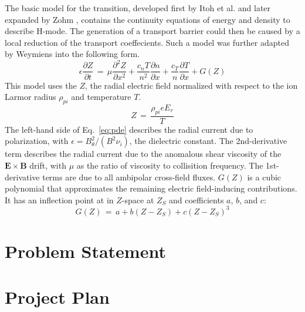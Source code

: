 \documentclass{article}
\begin{document}
The basic model for the transition, developed first by Itoh et al. \cite{itoh_edge_1991} and later expanded by Zohm \cite{zohm_dynamic_1994}, contains the continuity equations of energy and density to describe H-mode.
The generation of a transport barrier could then be caused by a local reduction of the transport coeffecients.
Such a model was further adapted by Weymiens \cite{weymiens_bifurcation_2014} into the following form.
\begin{equation}
	\epsilon \frac{\partial Z}{\partial t} \,=\, \mu \frac{\partial^2 Z}{\partial x^2} + \frac{c_n T}{n^2} \frac{\partial n}{\partial x} + \frac{c_T}{n} \frac{\partial T}{\partial x} + G(Z)
	\label{eq:pde}
\end{equation}
This model uses the $Z$, the radial electric field normalized with respect to the ion Larmor radius $\rho_{pi}$ and temperature $T$.
\begin{equation}
	Z \,=\, \frac{\rho_{pi} e E_r}{T}
	\label{eq:normalization}
\end{equation}
The left-hand side of Eq.~\ref{eq:pde} describes the radial current due to polarization, with $\epsilon = B_\theta^2 / (B^2 \nu_i)$, the dielectric constant.
The 2nd-derivative term describes the radial current due to the anomalous shear viscosity of the $\mathbf{E}\times\mathbf{B}$ drift, with $\mu$ as the ratio of viscosity to collisition frequency.
The 1st-derivative terms are due to all ambipolar cross-field fluxes.
$G(Z)$ is a cubic polynomial that approximates the remaining electric field-inducing contributions.
It has an inflection point at in $Z$-space at $Z_S$ and coefficients $a$, $b$, and $c$:
\begin{equation}
	G(Z) \,=\, a + b(Z - Z_S) + c(Z - Z_S)^3
\end{equation}


\section{Problem Statement}



\section{Project Plan}





\end{document}
